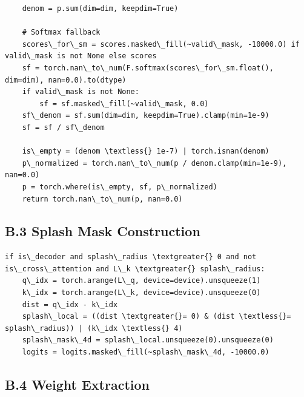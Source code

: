 \begin{lstlisting}
    denom = p.sum(dim=dim, keepdim=True)
    
    # Softmax fallback
    scores\_for\_sm = scores.masked\_fill(~valid\_mask, -10000.0) if valid\_mask is not None else scores
    sf = torch.nan\_to\_num(F.softmax(scores\_for\_sm.float(), dim=dim), nan=0.0).to(dtype)
    if valid\_mask is not None:
        sf = sf.masked\_fill(~valid\_mask, 0.0)
    sf\_denom = sf.sum(dim=dim, keepdim=True).clamp(min=1e-9)
    sf = sf / sf\_denom
    
    is\_empty = (denom \textless{} 1e-7) | torch.isnan(denom)
    p\_normalized = torch.nan\_to\_num(p / denom.clamp(min=1e-9), nan=0.0)
    p = torch.where(is\_empty, sf, p\_normalized)
    return torch.nan\_to\_num(p, nan=0.0)
\end{lstlisting}

\subsection{B.3 Splash Mask Construction}

\begin{lstlisting}
if is\_decoder and splash\_radius \textgreater{} 0 and not is\_cross\_attention and L\_k \textgreater{} splash\_radius:
    q\_idx = torch.arange(L\_q, device=device).unsqueeze(1)
    k\_idx = torch.arange(L\_k, device=device).unsqueeze(0)
    dist = q\_idx - k\_idx
    splash\_local = ((dist \textgreater{}= 0) & (dist \textless{}= splash\_radius)) | (k\_idx \textless{} 4)
    splash\_mask\_4d = splash\_local.unsqueeze(0).unsqueeze(0)
    logits = logits.masked\_fill(~splash\_mask\_4d, -10000.0)
\end{lstlisting}

\subsection{B.4 Weight Extraction}

